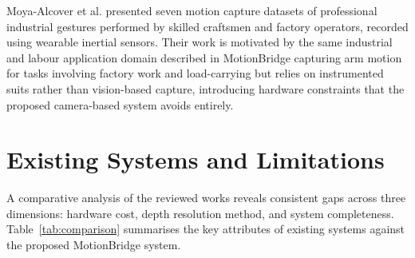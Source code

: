 Moya-Alcover et al. \cite{moya2023} presented seven motion capture datasets of professional industrial gestures performed by skilled craftsmen and factory operators, recorded using wearable inertial sensors. Their work is motivated by the same industrial and labour application domain described in MotionBridge capturing arm motion for tasks involving factory work and load-carrying but relies on instrumented suits rather than vision-based capture, introducing hardware constraints that the proposed camera-based system avoids entirely.
 
\section{Existing Systems and Limitations}
 
A comparative analysis of the reviewed works reveals consistent gaps across three dimensions: hardware cost, depth resolution method, and system completeness. Table~\ref{tab:comparison} summarises the key attributes of existing systems against the proposed MotionBridge system.
 
